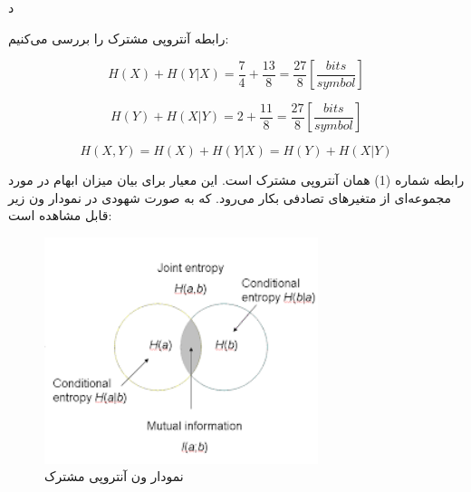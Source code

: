 \SubProblem
{د}
{
رابطه آنتروپی مشترک را بررسی می‌کنیم:
    
\begin{equation*}
    H(X) + H(Y|X) = \frac{7}{4} + \frac{13}{8} = \frac{27}{8} [\frac{bits}{symbol}]
\end{equation*}

\begin{equation*}
    H(Y) + H(X|Y) = 2 + \frac{11}{8} = \frac{27}{8} [\frac{bits}{symbol}]
\end{equation*}

\begin{equation}
    H(X, Y) = H(X) + H(Y|X) = H(Y) + H(X|Y)
\end{equation}

    رابطه شماره (1) همان آنتروپی مشترک است.
    این معیار برای بیان میزان ابهام در مورد مجموعه‌ای از متغیرهای تصادفی بکار می‌رود.
    که به صورت شهودی در نمودار ون زیر قابل مشاهده است:

    \begin{figure}[H]
        \includegraphics[width=8cm]{Images/Joint_Entropy.png}
        \centering
        \caption{نمودار ون آنتروپی مشترک}
    \end{figure}
}